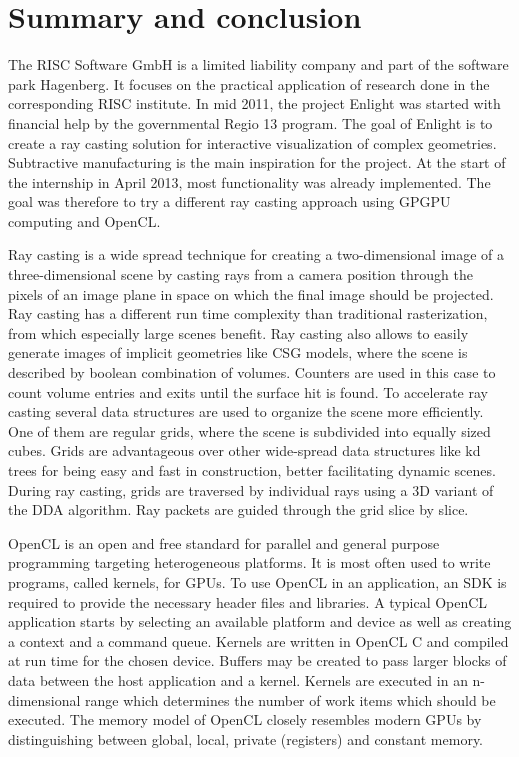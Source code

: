 \chapter{Summary and conclusion}
\label{sec:summary}

The RISC Software GmbH is a limited liability company and part of the software park Hagenberg. It focuses on the practical application of research done in the corresponding RISC institute. In mid 2011, the project Enlight was started with financial help by the governmental Regio 13 program. The goal of Enlight is to create a ray casting solution for interactive visualization of complex geometries. Subtractive manufacturing is the main inspiration for the project. At the start of the internship in April 2013, most functionality was already implemented. The goal was therefore to try a different ray casting approach using GPGPU computing and OpenCL.

Ray casting is a wide spread technique for creating a two-dimensional image of a three-dimensional scene by casting rays from a camera position through the pixels of an image plane in space on which the final image should be projected. Ray casting has a different run time complexity than traditional rasterization, from which especially large scenes benefit. Ray casting also allows to easily generate images of implicit geometries like CSG models, where the scene is described by boolean combination of volumes. Counters are used in this case to count volume entries and exits until the surface hit is found. To accelerate ray casting several data structures are used to organize the scene more efficiently. One of them are regular grids, where the scene is subdivided into equally sized cubes. Grids are advantageous over other wide-spread data structures like kd trees for being easy and fast in construction, better facilitating dynamic scenes. During ray casting, grids are traversed by individual rays using a 3D variant of the DDA algorithm. Ray packets are guided through the grid slice by slice.

OpenCL is an open and free standard for parallel and general purpose programming targeting heterogeneous platforms. It is most often used to write programs, called kernels, for GPUs. To use OpenCL in an application, an SDK is required to provide the necessary header files and libraries. A typical OpenCL application starts by selecting an available platform and device as well as creating a context and a command queue. Kernels are written in OpenCL C and compiled at run time for the chosen device. Buffers may be created to pass larger blocks of data between the host application and a kernel. Kernels are executed in an n-dimensional range which determines the number of work items which should be executed. The memory model of OpenCL closely resembles modern GPUs by distinguishing between global, local, private (registers) and constant memory.

